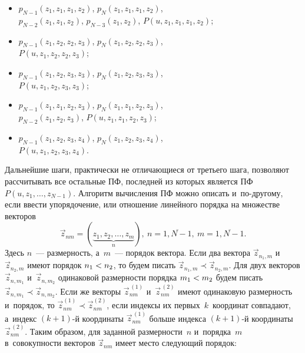 \begin{multicols}{2}
\begin{itemize}
\item $p_{N-1}(z_1,z_1,z_1,z_2)$,  $p_{N}(z_1,z_{1},z_1,z_2)$,\\
 $p_{N-2}(z_1,z_1,z_2)$, $p_{N-3}(z_1,z_2)$, $P(u,z_1,z_1,z_1,z_2)$;

\item $p_{N-1}(z_1,z_2,z_2,z_3)$,  $p_{N}(z_1,z_{2},z_2,z_3)$,\\
 $P(u,z_1,z_2,z_2,z_3)$;

\item $p_{N-1}(z_1,z_2,z_3,z_3)$,  $p_{N}(z_1,z_{2},z_3,z_3)$,\\
 $P(u,z_1,z_2,z_3,z_3)$;

\item $p_{N-1}(z_1,z_1,z_2,z_3)$,  $p_{N}(z_1,z_{1},z_2,z_3)$,\\
 $p_{N-2}(z_1,z_2,z_3)$, $P(u,z_1,z_1,z_2,z_3)$;

\item $p_{N-1}(z_1,z_2,z_3,z_4)$,  $p_{N}(z_1,z_{2},z_3,z_4)$,\\
 $P(u,z_1,z_2,z_3,z_4)$.
\end{itemize}

Дальнейшие шаги, практически не отличающиеся от третьего шага, позволяют
рассчитывать все остальные ПФ, последней из которых является ПФ 
$P(u,z_1,\ldots,z_{N-1})$.
Алгоритм вычисления ПФ можно описать и~по-дру\-го\-му, если
ввести упорядочение, или отношение линейного
порядка на множестве векторов 
$$
{\vec z}_{nm}=(\underbrace{z_1,z_2,\dots, z_m}_n),\ 
n = \overline{1,N-1},\ m = \overline{1,N-1}.
$$
 Здесь $n$~--- размерность, 
а~$m$~--- порядок вектора.
Если два вектора ${\vec z}_{n_1,m}$ и~${\vec z}_{n_2,m}$ имеют порядок $n_1\hm<n_2$,
то будем писать ${\vec z}_{n_1,m} \prec {\vec z}_{n_2,m}$. Для двух
векторов  ${\vec z}_{n,m_1}$ и~${\vec z}_{n,m_2}$ одинаковой размерности
порядка $m_1\hm<m_2$ будем писать
${\vec z}_{n,m_1} \prec {\vec z}_{n,m_2}$.
Если же векторы ${\vec z}^{\,(1)}_{nm}$ и~${\vec z}^{\,(2)}_{nm}$
имеют одинаковую размерность и~порядок, то
${\vec z}^{(1)}_{nm} \prec {\vec z}^{(2)}_{nm}$,
если индексы их первых~$k$~координат
совпадают, а~индекс $(k+1)$-й координаты ${\vec z}^{\,(1)}_{nm}$
больше индекса $(k+1)$-й координаты ${\vec z}^{\,(2)}_{nm}$.
Таким образом, для заданной размерности~$n$ и~порядка~$m$
в~совокупности векторов ${\vec z}_{nm}$
имеет место следующий порядок:


\end{multicols}

